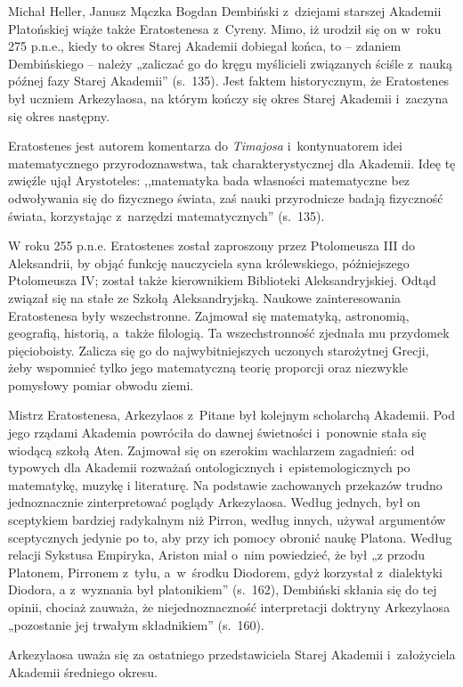 \begin{recplenv}{Michał Heller, Janusz Mączka}
Bogdan Dembiński z~dziejami starszej Akademii Platońskiej wiąże także Eratostenesa
 z~Cyreny. Mimo, iż urodził się on w~roku 275 p.n.e., kiedy to okres Starej Akademii dobiegał końca, to -- zdaniem
Dembińskiego -- należy „zaliczać go do kręgu myślicieli związanych ściśle z~nauką późnej fazy Starej Akademii” (s.~135).
Jest faktem historycznym, że Eratostenes był uczniem Arkezylaosa, na którym kończy się okres Starej Akademii i~zaczyna
się okres następny.


Eratostenes jest autorem komentarza do \textit{Timajosa} i~kontynuatorem idei
matematycznego przyrodoznawstwa, tak charakterystycznej dla Akademii. Ideę tę zwięźle ujął Arystoteles: ,,matematyka
bada własności matematyczne bez odwoływania się do fizycznego świata, zaś nauki przyrodnicze badają fizyczność świata,
korzystając z~narzędzi matematycznych'' (s.~135).


W roku 255 p.n.e. Eratostenes został zaproszony przez Ptolomeusza III do Aleksandrii,
by objąć funkcję nauczyciela syna królewskiego, późniejszego Ptolomeusza IV; został także kierownikiem Biblioteki
Aleksandryjskiej. Odtąd związał się na stałe ze Szkołą Aleksandryjską. Naukowe zainteresowania Eratostenesa były
wszechstronne. Zajmował się matematyką, astronomią, geografią, historią, a~także filologią. Ta wszechstronność zjednała
mu przydomek pięcioboisty. Zalicza się go do najwybitniejszych uczonych starożytnej Grecji, żeby wspomnieć tylko jego
matematyczną teorię proporcji oraz niezwykle pomysłowy pomiar obwodu ziemi.


Mistrz Eratostenesa, Arkezylaos z~Pitane był kolejnym scholarchą Akademii. Pod jego
rządami Akademia powróciła do dawnej świetności i~ponownie stała się wiodącą szkołą Aten. Zajmował się on szerokim
wachlarzem zagadnień: od typowych dla Akademii rozważań ontologicznych i~epistemologicznych po matematykę, muzykę
i literaturę. Na podstawie zachowanych przekazów trudno jednoznacznie zinterpretować poglądy Arkezylaosa. Według jednych,
był on sceptykiem bardziej radykalnym niż Pirron, według innych, używał argumentów sceptycznych jedynie po to, aby przy
ich pomocy obronić naukę Platona. Według relacji Sykstusa Empiryka, Ariston miał o~nim powiedzieć, że był „z przodu
Platonem, Pirronem z~tyłu, a~w~środku Diodorem, gdyż korzystał z~dialektyki Diodora,
a z~wyznania był platonikiem” (s.~162), Dembiński skłania się do tej opinii, chociaż zauważa, że niejednoznaczność
interpretacji doktryny Arkezylaosa „pozostanie jej trwałym składnikiem” (s.~160).


Arkezylaosa uważa się za ostatniego przedstawiciela Starej Akademii i~założyciela
Akademii średniego okresu.



\end{recplenv}
